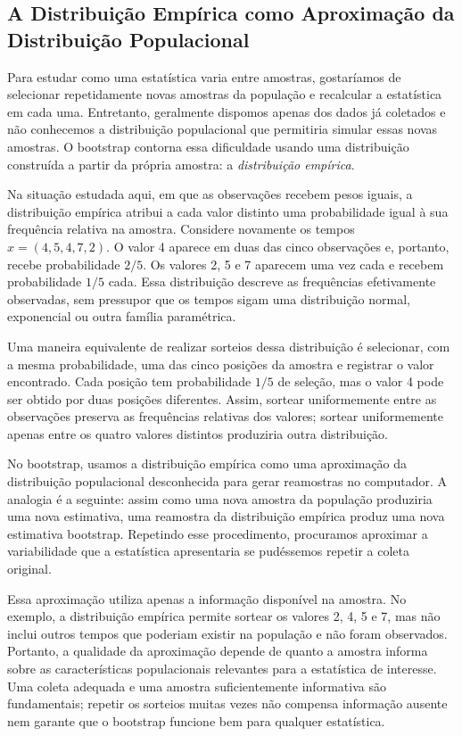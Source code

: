 \documentclass[12pt,a4paper]{article}
\begin{document}
\subsection{A Distribuição Empírica como Aproximação da Distribuição Populacional}

Para estudar como uma estatística varia entre amostras, gostaríamos de selecionar repetidamente novas amostras da população e recalcular a estatística em cada uma. Entretanto, geralmente dispomos apenas dos dados já coletados e não conhecemos a distribuição populacional que permitiria simular essas novas amostras. O bootstrap contorna essa dificuldade usando uma distribuição construída a partir da própria amostra: a \emph{distribuição empírica}.

Na situação estudada aqui, em que as observações recebem pesos iguais, a distribuição empírica atribui a cada valor distinto uma probabilidade igual à sua frequência relativa na amostra. Considere novamente os tempos $x=(4,5,4,7,2)$. O valor 4 aparece em duas das cinco observações e, portanto, recebe probabilidade $2/5$. Os valores 2, 5 e 7 aparecem uma vez cada e recebem probabilidade $1/5$ cada. Essa distribuição descreve as frequências efetivamente observadas, sem pressupor que os tempos sigam uma distribuição normal, exponencial ou outra família paramétrica.

Uma maneira equivalente de realizar sorteios dessa distribuição é selecionar, com a mesma probabilidade, uma das cinco posições da amostra e registrar o valor encontrado. Cada posição tem probabilidade $1/5$ de seleção, mas o valor 4 pode ser obtido por duas posições diferentes. Assim, sortear uniformemente entre as observações preserva as frequências relativas dos valores; sortear uniformemente apenas entre os quatro valores distintos produziria outra distribuição.

No bootstrap, usamos a distribuição empírica como uma aproximação da distribuição populacional desconhecida para gerar reamostras no computador. A analogia é a seguinte: assim como uma nova amostra da população produziria uma nova estimativa, uma reamostra da distribuição empírica produz uma nova estimativa bootstrap. Repetindo esse procedimento, procuramos aproximar a variabilidade que a estatística apresentaria se pudéssemos repetir a coleta original.

Essa aproximação utiliza apenas a informação disponível na amostra. No exemplo, a distribuição empírica permite sortear os valores 2, 4, 5 e 7, mas não inclui outros tempos que poderiam existir na população e não foram observados. Portanto, a qualidade da aproximação depende de quanto a amostra informa sobre as características populacionais relevantes para a estatística de interesse. Uma coleta adequada e uma amostra suficientemente informativa são fundamentais; repetir os sorteios muitas vezes não compensa informação ausente nem garante que o bootstrap funcione bem para qualquer estatística.
\end{document}

